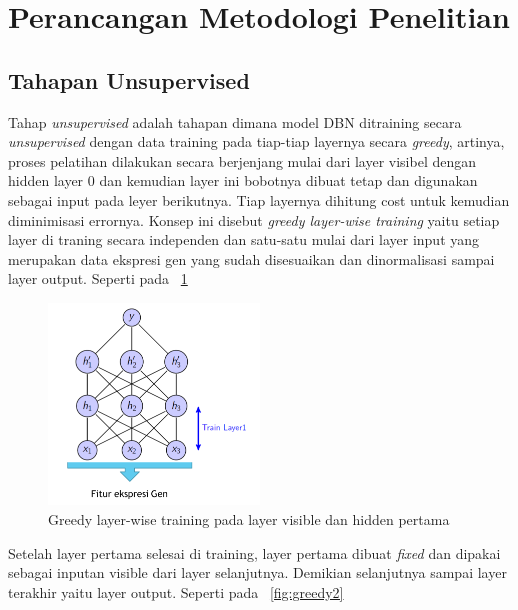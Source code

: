\section{Perancangan Metodologi Penelitian}

\subsection{Tahapan Unsupervised}
Tahap \textit{unsupervised} adalah tahapan dimana model DBN ditraining secara \textit{unsupervised} dengan data training pada tiap-tiap layernya secara \textit{greedy}, artinya, proses pelatihan dilakukan secara berjenjang mulai dari layer visibel dengan hidden layer 0 dan kemudian layer ini bobotnya dibuat tetap dan digunakan sebagai input pada leyer berikutnya. Tiap layernya dihitung cost untuk kemudian diminimisasi errornya. Konsep ini disebut \textit{greedy layer-wise training} yaitu setiap layer di traning secara independen dan satu-satu mulai dari layer input yang merupakan data ekspresi gen yang sudah disesuaikan dan dinormalisasi sampai layer output. Seperti pada \pic~\ref{fig:greedy1}

\begin{figure}
	\centering
	\includegraphics[width=0.5\textwidth]
		{pics/greedy1.png}
	\caption{Greedy layer-wise training pada layer visible dan hidden pertama}
	\label{fig:greedy1}
\end{figure}

Setelah layer pertama selesai di training, layer pertama dibuat \textit{fixed} dan dipakai sebagai inputan visible dari layer selanjutnya. Demikian selanjutnya sampai layer terakhir yaitu layer output. Seperti pada \pic~\ref{fig:greedy2}

